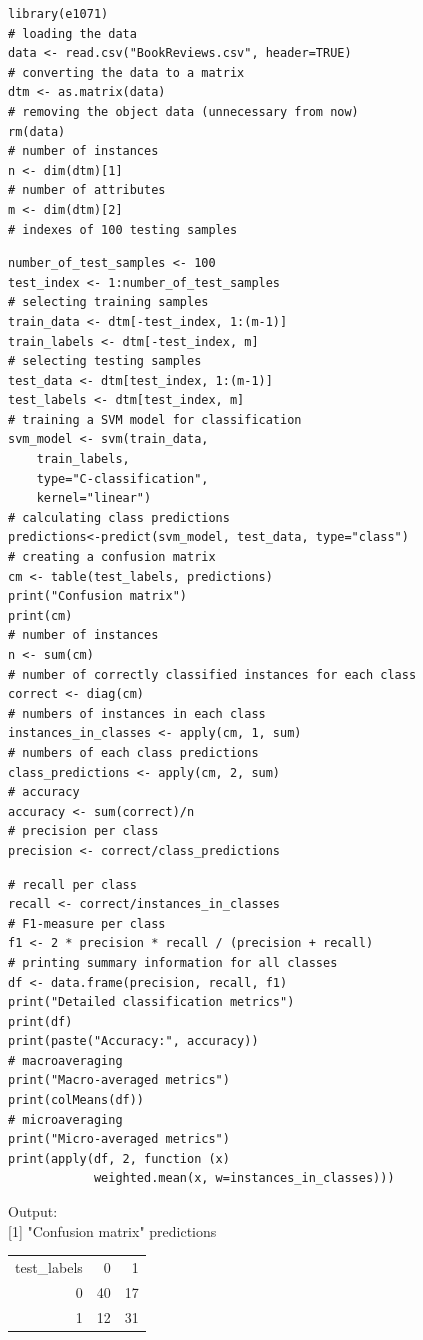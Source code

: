\begin{verbatim}
library(e1071)
# loading the data
data <- read.csv("BookReviews.csv", header=TRUE)
# converting the data to a matrix
dtm <- as.matrix(data)
# removing the object data (unnecessary from now)
rm(data)
# number of instances
n <- dim(dtm)[1]
# number of attributes
m <- dim(dtm)[2]
# indexes of 100 testing samples
\end{verbatim}

\begin{verbatim}
number_of_test_samples <- 100
test_index <- 1:number_of_test_samples
# selecting training samples
train_data <- dtm[-test_index, 1:(m-1)]
train_labels <- dtm[-test_index, m]
# selecting testing samples
test_data <- dtm[test_index, 1:(m-1)]
test_labels <- dtm[test_index, m]
# training a SVM model for classification
svm_model <- svm(train_data,
    train_labels,
    type="C-classification",
    kernel="linear")
# calculating class predictions
predictions<-predict(svm_model, test_data, type="class")
# creating a confusion matrix
cm <- table(test_labels, predictions)
print("Confusion matrix")
print(cm)
# number of instances
n <- sum(cm)
# number of correctly classified instances for each class
correct <- diag(cm)
# numbers of instances in each class
instances_in_classes <- apply(cm, 1, sum)
# numbers of each class predictions
class_predictions <- apply(cm, 2, sum)
# accuracy
accuracy <- sum(correct)/n
# precision per class
precision <- correct/class_predictions
\end{verbatim}

\begin{verbatim}
# recall per class
recall <- correct/instances_in_classes
# F1-measure per class
f1 <- 2 * precision * recall / (precision + recall)
# printing summary information for all classes
df <- data.frame(precision, recall, f1)
print("Detailed classification metrics")
print(df)
print(paste("Accuracy:", accuracy))
# macroaveraging
print("Macro-averaged metrics")
print(colMeans(df))
# microaveraging
print("Micro-averaged metrics")
print(apply(df, 2, function (x)
            weighted.mean(x, w=instances_in_classes)))
\end{verbatim}

Output:\\[0pt]
[1] "Confusion matrix" predictions

\begin{center}
\begin{tabular}{rrr}
test\_labels & 0 & 1 \\
0 & 40 & 17 \\
1 & 12 & 31 \\
\end{tabular}
\end{center}

